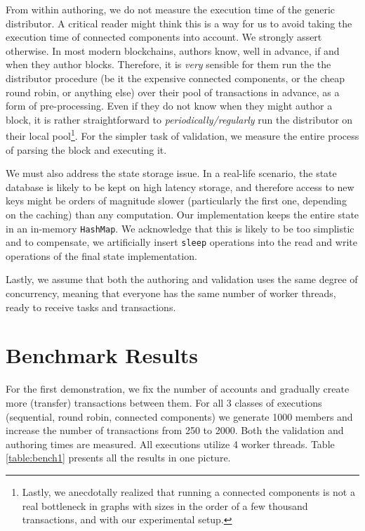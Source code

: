 From within authoring, we do not measure the execution time of the generic distributor. A critical
reader might think this is a way for us to avoid taking the execution time of connected components
into account. We strongly assert otherwise. In most modern blockchains, authors know, well in
advance, if and when they author blocks. Therefore, it is \textit{very} sensible for them run the
the distributor procedure (be it the expensive connected components, or the cheap round robin, or
anything else) over their pool of transactions in advance, as a form of pre-processing. Even if they
do not know when they might author a block, it is rather straightforward to
\textit{periodically/regularly} run the distributor on their local pool\footnote{Lastly, we
anecdotally realized that running a connected components is not a real bottleneck in graphs with
sizes in the order of a few thousand transactions, and with our experimental setup.}. For the
simpler task of validation, we measure the entire process of parsing the block and executing it.

We must also address the state storage issue. In a real-life scenario, the state database is likely
to be kept on high latency storage, and therefore access to new keys might be orders of magnitude
slower (particularly the first one, depending on the caching) than any computation. Our
implementation keeps the entire state in an in-memory \texttt{HashMap}. We acknowledge that this is
likely to be too simplistic and to compensate, we artificially insert \texttt{sleep} operations into
the read and write operations of the final state implementation.

Lastly, we assume that both the authoring and validation uses the same degree of concurrency,
meaning that everyone has the same number of worker threads, ready to receive tasks and
transactions.

\section{Benchmark Results} \label{chap_b&a:sec:results}

For the first demonstration, we fix the number of accounts and gradually create more (transfer)
transactions between them. For all 3 classes of executions (sequential, round robin, connected
components) we generate 1000 members and increase the number of transactions from 250 to 2000. Both
the validation and authoring times are measured. All executions utilize 4 worker threads. Table
\ref{table:bench1} presents all the results in one picture.

